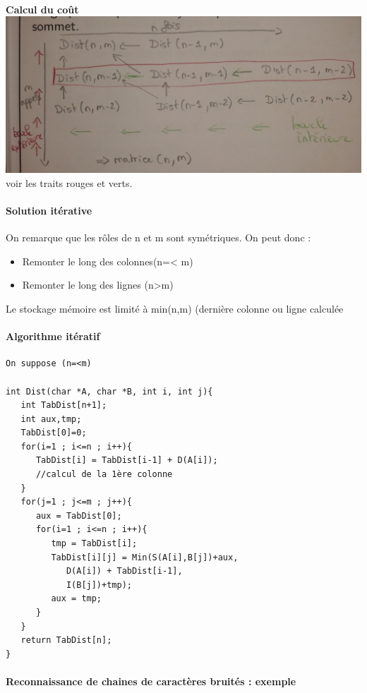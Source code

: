 \paragraph{}
\textbf{Calcul du coût}\\
\includegraphics[width=15cm]{Photo0090}
voir les traits rouges et verts.


\paragraph{Solution itérative}
On remarque que les rôles de n et m sont symétriques. On peut donc :
\begin{itemize}
\item Remonter le long des colonnes(n=< m)
\item Remonter le long des lignes (n>m)
\end{itemize}
Le stockage mémoire est limité à min(n,m) (dernière colonne ou ligne calculée


\paragraph{Algorithme itératif}

\begin{verbatim}
On suppose (n=<m)

int Dist(char *A, char *B, int i, int j){
   int TabDist[n+1];
   int aux,tmp;
   TabDist[0]=0;
   for(i=1 ; i<=n ; i++){
      TabDist[i] = TabDist[i-1] + D(A[i]);
      //calcul de la 1ère colonne
   }
   for(j=1 ; j<=m ; j++){
      aux = TabDist[0];
      for(i=1 ; i<=n ; i++){
         tmp = TabDist[i];
         TabDist[i][j] = Min(S(A[i],B[j])+aux,
            D(A[i]) + TabDist[i-1],
            I(B[j])+tmp);
         aux = tmp;
      }
   }
   return TabDist[n];
}
\end{verbatim}

\paragraph{}
\textbf{Reconnaissance de chaines de caractères bruités : exemple}\\

